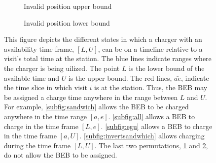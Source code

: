 \documentclass[11pt,a4paper,final]{article}
\begin{document}
\begin{figure}
\par\bigskip

\begin{subfigure}{\textwidth}
    \centering
    \caption{Invalid position upper bound}
    \label{subfig:invalid-upper}
\end{subfigure}

\par\bigskip

\begin{subfigure}{\textwidth}
    \centering
    \caption{Invalid position lower bound}
    \label{subfig:invalid-lower}
\end{subfigure}

\caption{This figure depicts the different states in which a charger with an availability time frame, $[L,U]$, can be on a timeline relative to a visit's total time at the station. The blue lines indicate ranges where the charger is being uilized. The point $L$ is the lower bound of the available time and $U$ is the upper bound. The red lines, $\bar{ae}$, indicate the time slice in which visit $i$ is at the station. Thus, the BEB may be assigned a charge time anywhere in the range between $L$ and $U$. For example, \ref{subfig:sandwich} allows the BEB to be charged anywhere in the time range $[a, e]$. \ref{subfig:all} allows a BEB to charge in the time frame $[L,e]$. \ref{subfig:egu} allows a BEB to charge in the time frame $[a,U]$. \ref{subfig:invertsandwhich} allows charging during the time frame $[L,U]$. The last two permutations, \ref{subfig:invalid-upper} and \ref{subfig:invalid-lower}, do not allow the BEB to be assigned.}
\label{fig:find-free}
\end{figure}
\end{document}
